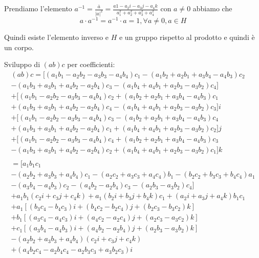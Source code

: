 \documentclass[a4paper,11pt]{article}
\begin{document}
Prendiamo l'elemento $a^{-1} = \frac{\bar a}{|a|^2} = \frac{a1 - a_2 i - a_3 j - a_4 k}{a_1^2 + a_2^2 + a_3^2 + a_4^2 } $ con $a \ne 0$ abbiamo che
\[
	a \cdot a^{-1} = a^{-1} \cdot a = 1, \forall a \ne 0, a \in H
\]

Quindi  esiste l'elemento inverso e $H$ e un gruppo rispetto al prodotto e quindi è un corpo.


Sviluppo di $(a b) c$ per coefficienti:
\begin{eqnarray*}
	(a b) c = [(a_1 b_1 - a_2 b_2 - a_3 b_3  - a_4 b_4) c_1  - (a_1 b_2 + a_2 b_1 + a_3 b_4 - a_4 b_3) c_2
\\
	- (a_1 b_3 + a_3 b_1 + a_4 b_2 - a_2 b_4) c_3 - (a_1 b_4 + a_4 b_1 + a_2 b_3 - a_3 b_2) c_4]
\\
	+ [(a_1 b_1 - a_2 b_2 - a_3 b_3  - a_4 b_4) c_2 + (a_1 b_2 + a_2 b_1 + a_3 b_4 - a_4 b_3) c_1
\\
	+(a_1 b_3 + a_3 b_1 + a_4 b_2 - a_2 b_4) c_4 -  (a_1 b_4 + a_4 b_1 + a_2 b_3 - a_3 b_2) c_3] i
\\
	+ [(a_1 b_1 - a_2 b_2 - a_3 b_3  - a_4 b_4) c_3 - (a_1 b_2 + a_2 b_1 + a_3 b_4 - a_4 b_3) c_4
\\
	+(a_1 b_3 + a_3 b_1 + a_4 b_2 - a_2 b_4) c_1 +  (a_1 b_4 + a_4 b_1 + a_2 b_3 - a_3 b_2) c_2] j
\\
	+ [(a_1 b_1 - a_2 b_2 - a_3 b_3  - a_4 b_4) c_4 + (a_1 b_2 + a_2 b_1 + a_3 b_4 - a_4 b_3) c_3
\\
	-(a_1 b_3 + a_3 b_1 + a_4 b_2 - a_2 b_4) c_2 +  (a_1 b_4 + a_4 b_1 + a_2 b_3 - a_3 b_2) c_1] k
\\
\\
	= [a_1 b_1 c_1
\\
	- (a_2 b_2 + a_3 b_3 + a_4 b_4) c_1 - (a_2 c_2 + a_3 c_3 + a_4 c_4) b_1 - (b_2 c_2 + b_3 c_3 + b_4 c_4) a_1
\\
	- (a_3 b_4 - a_4 b_3) c_2 - (a_4 b_2 - a_2 b_4) c_3 - (a_2 b_3 - a_3 b_2) c_4]
\\
	+ a_1 b_1(c_2 i + c_3 j + c_4 k) + a_1 (b_2 i + b_3 j + b_4 k) c_1 + (a_2 i + a_3 j + a_4 k) b_1 c_1
\\
	+ a_1 [(b_3 c_4 - b_4 c_3) i + (b_4 c_2 - b_2 c_4) j + (b_2 c_3 - b_3 c_2) k]
\\
	+ b_1 [(a_3 c_4 - a_4 c_3) i + (a_4 c_2 - a_2 c_4) j + (a_2 c_3 - a_3 c_2) k]
\\
	+ c_1 [(a_3 b_4 - a_4 b_3) i + (a_4 b_2 - a_2 b_4) j + (a_2 b_3 - a_3 b_2) k]
\\
	- (a_2 b_2 + a_3 b_3 + a_4 b_4)(c_2 i + c_3 j + c_4 k)
\\
	+(a_4 b_2 c_4 - a_2 b_4 c_4 - a_2 b_3 c_3 + a_3 b_2 c_3) i

\end{eqnarray*}
\end{document}
